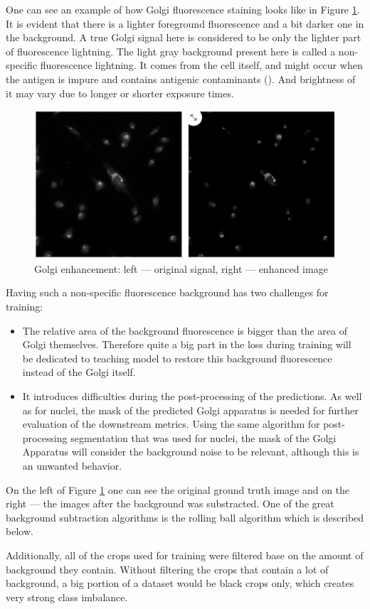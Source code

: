 One can see an example of how Golgi fluorescence staining looks like in Figure \ref{fig:golgi-enhancement}. It is evident that there is a lighter foreground fluorescence and a bit darker one in the background. A true Golgi signal here is considered to be only the lighter part of fluorescence lightning. The light gray background present here is called a non-specific fluorescence lightning. It comes from the cell itself, and might occur when the antigen is impure and contains antigenic contaminants (\cite{Borek_1984}). And brightness of it may vary due to longer or shorter exposure times. 

\begin{figure}[htb]
	\begin{center}
		\includegraphics[width=0.5\linewidth]{bilder/enhancement.jpg}
		\caption{Golgi enhancement: left --- original signal, right --- enhanced image}\label{fig:golgi-enhancement}
	\end{center}
\end{figure}

Having such a non-specific fluorescence background has two challenges for training:
\begin{itemize}
    \item The relative area of the background fluorescence is bigger than the area of Golgi themselves. Therefore quite a big part in the loss during training will be dedicated to teaching model to restore this background fluorescence instead of the Golgi itself.
    \item It introduces difficulties during the post-processing of the predictions. As well as for nuclei, the mask of the predicted Golgi apparatus is needed for further evaluation of the downstream metrics. Using the same algorithm for post-processing segmentation that was used for nuclei, the mask of the Golgi Apparatus will consider the background noise to be relevant, although this is an unwanted behavior.
\end{itemize}

On the left of Figure \ref{fig:golgi-enhancement} one can see the original ground truth image and on the right --- the images after the background was substracted. One of the great background subtraction algorithms is the rolling ball algorithm which is described below.

Additionally, all of the crops used for training were filtered base on the amount of background they contain. Without filtering the crops that contain a lot of background, a big portion of a dataset would be black crops only, which creates very strong class imbalance.
